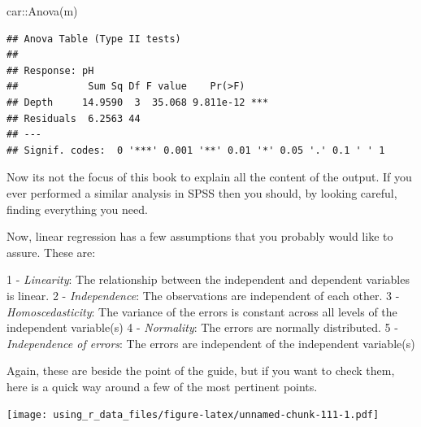 \documentclass[
]{book}
\newenvironment{Shaded}{\begin{snugshade}}{\end{snugshade}}
\newcommand{\CommentTok}[1]{\textcolor[rgb]{0.56,0.35,0.01}{\textit{#1}}}
\newcommand{\DocumentationTok}[1]{\textcolor[rgb]{0.56,0.35,0.01}{\textbf{\textit{#1}}}}
\newcommand{\FunctionTok}[1]{\textcolor[rgb]{0.00,0.00,0.00}{#1}}
\newcommand{\NormalTok}[1]{#1}
\newcommand{\OtherTok}[1]{\textcolor[rgb]{0.56,0.35,0.01}{#1}}
\newcommand{\SpecialCharTok}[1]{\textcolor[rgb]{0.00,0.00,0.00}{#1}}
\begin{document}
\begin{Shaded}
\begin{Highlighting}[]
\NormalTok{car}\SpecialCharTok{::}\FunctionTok{Anova}\NormalTok{(m)}
\end{Highlighting}
\end{Shaded}

\begin{verbatim}
## Anova Table (Type II tests)
## 
## Response: pH
##            Sum Sq Df F value    Pr(>F)    
## Depth     14.9590  3  35.068 9.811e-12 ***
## Residuals  6.2563 44                      
## ---
## Signif. codes:  0 '***' 0.001 '**' 0.01 '*' 0.05 '.' 0.1 ' ' 1
\end{verbatim}

Now its not the focus of this book to explain all the content of the output. If you ever performed a similar analysis in SPSS then you should, by looking careful, finding everything you need.

Now, linear regression has a few assumptions that you probably would like to assure. These are:

1 - \emph{Linearity}: The relationship between the independent and dependent variables is linear.
2 - \emph{Independence}: The observations are independent of each other.
3 - \emph{Homoscedasticity}: The variance of the errors is constant across all levels of the independent variable(s)
4 - \emph{Normality}: The errors are normally distributed.
5 - \emph{Independence of errors}: The errors are independent of the independent variable(s)

Again, these are beside the point of the guide, but if you want to check them, here is a quick way around a few of the most pertinent points.

\begin{Shaded}
\end{Shaded}

\texttt{[image: using\_r\_data\_files/figure-latex/unnamed-chunk-111-1.pdf]}

\begin{Shaded}
\end{Shaded}
\end{document}
